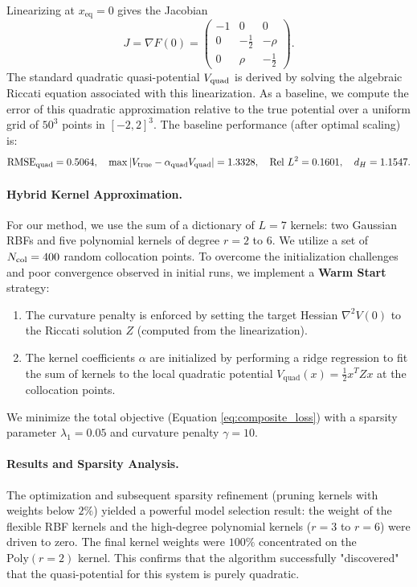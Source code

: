 \documentclass[11pt]{article}
\theoremstyle{plain}      %
\theoremstyle{definition} %
\begin{document}
Linearizing at $x_{\mathrm{eq}}=0$ gives the Jacobian
\[
  J = \nabla F(0)
  = \begin{pmatrix}
    -1 & 0 & 0\\
    0  & -\tfrac12 & -\rho\\
    0  &  \rho     & -\tfrac12
  \end{pmatrix}.
\]
The standard quadratic quasi-potential $V_{\rm quad}$ is derived by solving the algebraic Riccati equation associated with this linearization. As a baseline, we compute the error of this quadratic approximation relative to the true potential over a uniform grid of $50^3$ points in $[-2,2]^3$. The baseline performance (after optimal scaling) is:
\[
  \mathrm{RMSE}_{\rm quad}=0.5064,\quad
  \max|V_{\rm true}-\alpha_{\rm quad}V_{\rm quad}|=1.3328,\quad
  \mathrm{Rel\ }L^2=0.1601,\quad
  d_H=1.1547.
\]

\paragraph{Hybrid Kernel Approximation.}
For our method, we use the sum of a dictionary of $L=7$ kernels: two Gaussian RBFs and five polynomial kernels of degree $r=2$ to $6$. We utilize a set of $N_{\rm col}=400$ random collocation points. To overcome the initialization challenges and poor convergence observed in initial runs, we implement a \textbf{Warm Start} strategy:
\begin{enumerate}
    \item The curvature penalty is enforced by setting the target Hessian $\nabla^2V(0)$ to the Riccati solution $Z$ (computed from the linearization).
    \item The kernel coefficients $\alpha$ are initialized by performing a ridge regression to fit the sum of kernels to the local quadratic potential $V_{\text{quad}}(x) = \frac{1}{2}x^T Z x$ at the collocation points.
\end{enumerate}
We minimize the total objective (Equation \ref{eq:composite_loss}) with a sparsity parameter $\lambda_1 = 0.05$ and curvature penalty $\gamma=10$.

\paragraph{Results and Sparsity Analysis.}
The optimization and subsequent sparsity refinement (pruning kernels with weights below $2\%$) yielded a powerful model selection result: the weight of the flexible RBF kernels and the high-degree polynomial kernels ($r=3$ to $r=6$) were driven to zero. The final kernel weights were $100\%$ concentrated on the $\text{Poly}(r=2)$ kernel. This confirms that the algorithm successfully "discovered" that the quasi-potential for this system is purely quadratic.
\end{document}
